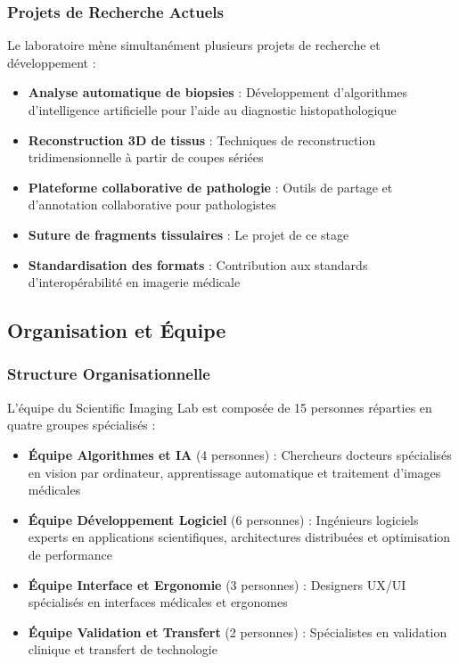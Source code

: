 \documentclass[12pt,a4paper]{report}
\begin{document}
\subsubsection{Projets de Recherche Actuels}

Le laboratoire mène simultanément plusieurs projets de recherche et développement :

\begin{itemize}
\item \textbf{Analyse automatique de biopsies} : Développement d'algorithmes d'intelligence artificielle pour l'aide au diagnostic histopathologique
\item \textbf{Reconstruction 3D de tissus} : Techniques de reconstruction tridimensionnelle à partir de coupes sériées
\item \textbf{Plateforme collaborative de pathologie} : Outils de partage et d'annotation collaborative pour pathologistes
\item \textbf{Suture de fragments tissulaires} : Le projet de ce stage
\item \textbf{Standardisation des formats} : Contribution aux standards d'interopérabilité en imagerie médicale
\end{itemize}

\subsection{Organisation et Équipe}

\subsubsection{Structure Organisationnelle}

L'équipe du Scientific Imaging Lab est composée de 15 personnes réparties en quatre groupes spécialisés :

\begin{itemize}
\item \textbf{Équipe Algorithmes et IA} (4 personnes) : Chercheurs docteurs spécialisés en vision par ordinateur, apprentissage automatique et traitement d'images médicales
\item \textbf{Équipe Développement Logiciel} (6 personnes) : Ingénieurs logiciels experts en applications scientifiques, architectures distribuées et optimisation de performance
\item \textbf{Équipe Interface et Ergonomie} (3 personnes) : Designers UX/UI spécialisés en interfaces médicales et ergonomes
\item \textbf{Équipe Validation et Transfert} (2 personnes) : Spécialistes en validation clinique et transfert de technologie
\end{itemize}
\end{document}
